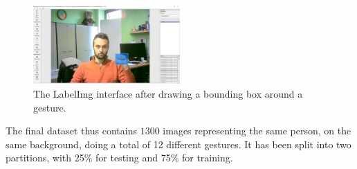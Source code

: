 \documentclass[a4paper, 12pt]{article}
\begin{document}
\begin{flushleft}
\begin{figure}[!h]
    \centering
    \includegraphics[width=0.5\textwidth]{resources/image/labelImgScreenshot.PNG} \caption{The LabelImg interface after drawing a bounding box around a gesture.}
\end{figure}

The final dataset thus contains $1300$ images representing the same person, on the same background, doing a total of 12 different gestures. It has been split into two partitions, with 25\% for testing and 75\% for training.
\end{flushleft}
\end{document}

